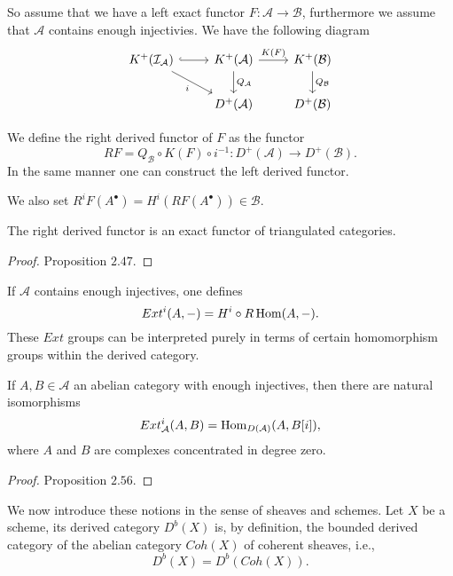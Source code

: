 \documentclass[
	oldfontcommands,
	sumario=abnt-6027-2012,
	12pt,			%
	openright,		%
	oneside,		%
	a4paper,		%
	english,		%
	brazil			%
	]{imecc-unicamp}
\begin{document}
So assume that we have a left exact functor $F:\mathcal A \rightarrow \mathcal B$, furthermore we assume that $\mathcal A$ contains enough injectivies. We have the following diagram $$
\begin{tikzcd}
K^+(\mathcal I_\mathcal A) \arrow[r, hook] \arrow[rd, "i"'] & K^+(\mathcal A) \arrow[r, "K(F)"] \arrow[d, "Q_\mathcal A"] & K^+(\mathcal B) \arrow[d, "Q_\mathcal B"] \\
& D^+(\mathcal A)                                             & D^+(\mathcal B)                          
\end{tikzcd}
$$

\begin{definition}
	
	We define the right derived functor of $F$ as the functor $$
	RF=Q_\mathcal B \circ K(F) \circ i^{-1}:D^+(\mathcal A)\rightarrow D^+(\mathcal B).
	$$
	In the same manner one can construct the left derived functor.
	
	We also set $R^iF(A^\bullet)=H^i(RF(A^\bullet))\in \mathcal B$.
	
\end{definition}
\begin{proposition}
	
	The right derived functor is an exact functor of triangulated categories.
	
\end{proposition}
\begin{proof}
	\cite{huybrechts2006fourier} Proposition $2.47$.
\end{proof}
\begin{definition}
	If $\mathcal A$ contains enough injectives, one defines $$
	Ext^i(A,-)=H^i\circ R\operatorname{Hom}(A,-).
	$$
	These $Ext$ groups can be interpreted purely in terms of certain homomorphism groups within the derived category. 
\end{definition}
\begin{proposition}
	If $A, B\in \mathcal A$ an abelian category with enough injectives, then there are natural isomorphisms $$
	Ext^i_{\mathcal A} (A,B)=\operatorname{Hom}_{D(\mathcal A)}(A,B[i]),
	$$
	where $A$ and $B$ are complexes concentrated in degree zero.
\end{proposition}
\begin{proof}
	\cite{huybrechts2006fourier} Proposition $2.56$.
\end{proof}

We now introduce these notions in the sense of sheaves and schemes. Let $X$ be a scheme, its derived category $D^b(X)$ is, by definition, the bounded derived category of the abelian category $Coh(X)$ of coherent sheaves, i.e.,
$$
D^b(X)=D^b(Coh(X)).
$$
\end{document}
